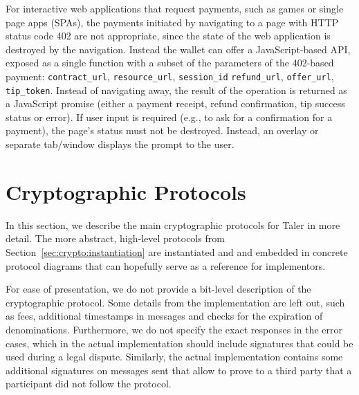 For interactive web applications that request payments, such as games or single
page apps (SPAs), the payments initiated by navigating to a page with HTTP
status code 402 are not appropriate, since the state of the web application is
destroyed by the navigation.  Instead the wallet can offer a JavaScript-based
API, exposed as a single function with a subset of the parameters of the
402-based payment: \texttt{contract\_url}, \texttt{resource\_url},
\texttt{session\_id} \texttt{refund\_url}, \texttt{offer\_url},
\texttt{tip\_token}.  Instead of navigating away, the result of the operation
is returned as a JavaScript promise (either a payment receipt, refund
confirmation, tip success status or error).  If user input is required (e.g., to
ask for a confirmation for a payment), the page's status must not be destroyed.
Instead, an overlay or separate tab/window displays the prompt to the user.




\newcommand\inecc{\in \mathbb{Z}_{|\mathbb{E}|}}
\newcommand\inept{\in {\mathbb{E}}}
\newcommand\inrsa{\in \mathbb{Z}_{|\mathrm{dom}(\FDH_K)|}}

\section{Cryptographic Protocols}

\def\HKDF{\textrm{HKDF}}
\def\KDF{\textrm{KDF}}
\def\FDH{\textrm{FDH}}
\newcommand{\iseq}{\stackrel{?}{=}}
\newcommand{\iseqv}{\stackrel{?}{\equiv}}
\newcommand{\pccheck}{\mathbf{check}\ }

In this section, we describe the main cryptographic protocols for Taler in more
detail.  The more abstract, high-level protocols from
Section~\ref{sec:crypto:instantiation} are instantiated and and embedded in
concrete protocol diagrams that can hopefully serve as a reference for
implementors.

For ease of presentation, we do not provide a bit-level description of the
cryptographic protocol.  Some details from the implementation are left out,
such as fees, additional timestamps in messages and checks for the expiration
of denominations. Furthermore, we do not specify the exact responses in the
error cases, which in the actual implementation should include signatures that
could be used during a legal dispute.  Similarly, the actual implementation
contains some additional signatures on messages sent that allow to prove to a
third party that a participant did not follow the protocol.


